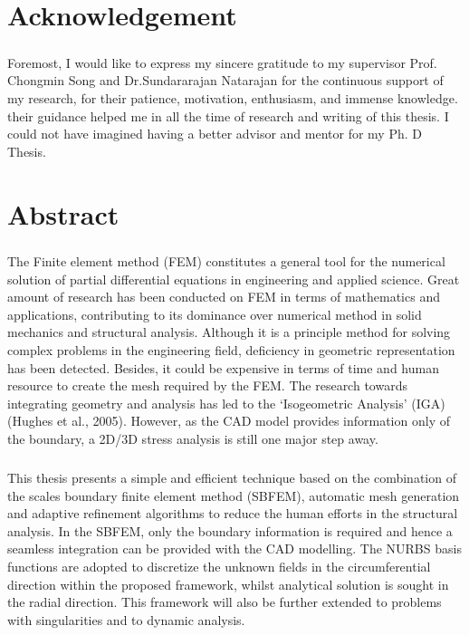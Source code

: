 



\chapter*{Acknowledgement}
\paragraph{}
Foremost, I would like to express my sincere gratitude to my supervisor Prof. Chongmin Song and Dr.Sundararajan Natarajan for the continuous support of my research, for their patience, motivation, enthusiasm, and immense knowledge.
their guidance helped me in all the time of research and writing of this thesis.
I could not have imagined having a better advisor and mentor for my Ph. D Thesis.


\chapter*{Abstract}
\paragraph{}
The Finite element method (FEM) constitutes a general tool for the numerical solution of partial differential equations in engineering and applied science.
Great amount of research has been conducted on FEM in terms of mathematics and applications, contributing to its dominance over numerical method in solid mechanics and structural analysis.
Although it is a principle method for solving complex problems in the engineering field, deficiency in geometric representation has been detected.
Besides, it could be expensive in terms of time and human resource to create the mesh required by the FEM.
The research towards integrating geometry and analysis has led to the ‘Isogeometric Analysis’ (IGA) (Hughes et al., 2005).
However, as the CAD model provides information only of the boundary, a 2D/3D stress analysis is still one major step away.

\paragraph{}
This thesis presents a simple and efficient technique based on the combination of the scales boundary finite element method (SBFEM), automatic mesh generation and adaptive refinement algorithms to reduce the human efforts in the structural analysis.
In the SBFEM, only the boundary information is required and hence a seamless integration can be provided with the CAD modelling.
The NURBS basis functions are adopted to discretize the unknown fields in the circumferential direction within the proposed framework, whilst analytical solution is sought in the radial direction.
This framework will also be further extended to problems with singularities and to dynamic analysis.

